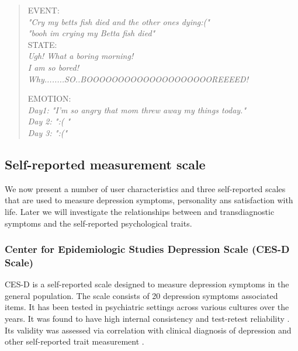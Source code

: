 \begin{quote}{\itshape}
EVENT: \\
\textit{"Cry my betts fish died and the other ones dying:("\\
"booh im crying my Betta fish died"}\\

STATE:\\
\textit{Ugh! What a boring morning!\\
I am so bored!\\
Why........SO..BOOOOOOOOOOOOOOOOOOOOREEEED!\\}

EMOTION: \\
\textit{Day1: "I'm so angry that mom threw away my things today." \\
Day 2: ":( "  \\
Day 3: ":(" } \\
\end{quote}

\subsection{Self-reported measurement scale}
We now present a number of user characteristics and three self-reported scales that are used to measure depression symptoms, personality ans satisfaction with life. Later we will investigate the relationships between and transdiagnostic symptoms and the self-reported psychological traits. 

\subsubsection{Center for Epidemiologic Studies Depression Scale (CES-D Scale)}
CES-D is a self-reported scale designed to measure depression symptoms in the general population\cite{Radloff77}. The scale consists of 20 depression symptoms associated items. It has been tested in psychiatric settings across various cultures over the years. It was found to have high internal consistency and test-retest reliability \cite{Radloff77,Herz86,Roberts80}. Its validity was assessed via correlation with clinical diagnosis of depression and other self-reported trait measurement \cite{Herz86}. 

